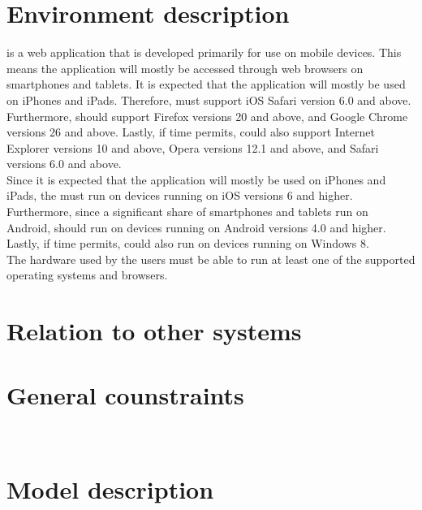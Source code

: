\section{Environment description}
\projectname is a web application that is developed primarily for use on mobile devices. This means the application will mostly be accessed through web browsers on smartphones and tablets. It is expected that the application will mostly be used on iPhones and iPads. Therefore, \projectname must support iOS Safari version 6.0 and above. Furthermore, \projectname should support Firefox versions 20 and above, and Google Chrome versions 26 and above. Lastly, if time permits, \projectname could also support Internet Explorer versions 10 and above, Opera versions 12.1 and above, and Safari versions 6.0 and above. \\
Since it is expected that the application will mostly be used on iPhones and iPads, the \applicationname must run on devices running on iOS versions 6 and higher. Furthermore, since a significant share of smartphones and tablets run on Android, \projectname should run on devices running on Android versions 4.0 and higher. Lastly, if time permits, \projectname could also run on devices running on Windows 8.\\
The hardware used by the users must be able to run at least one of the supported operating systems and browsers.\\

\section{Relation to other systems}


\section{General counstraints}\

\section{Model description}
